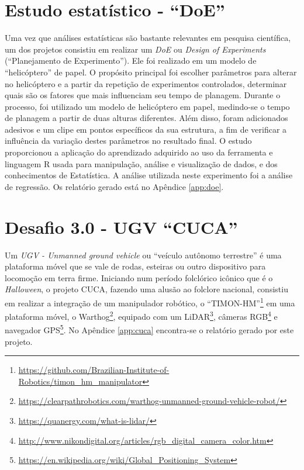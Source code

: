  \section{Estudo estatístico - ``DoE''}

Uma vez que análises estatísticas são bastante relevantes em pesquisa científica, um dos projetos consistiu em realizar um \textit{DoE} ou \textit{Design of Experiments} (``Planejamento de Experimento''). Ele foi realizado em um modelo de ``helicóptero'' de papel. O propósito principal foi escolher parâmetros para alterar no helicóptero e a partir da repetição de experimentos controlados, determinar quais são os fatores que mais influenciam seu tempo de planagem. Durante o processo, foi utilizado um modelo de helicóptero em papel, medindo-se o tempo de planagem a partir de duas alturas diferentes. Além disso, foram adicionados adesivos e um clipe em pontos específicos da sua estrutura, a fim de verificar a influência da variação destes parâmetros no resultado final. O estudo proporcionou a aplicação do aprendizado adquirido ao uso da ferramenta e linguagem R usada para manipulação, análise e visualização de dados, e dos conhecimentos de Estatística. A análise utilizada neste experimento foi a análise de regressão. Os relatório gerado está no Apêndice \ref{app:doe}.

\section{Desafio 3.0 - UGV ``CUCA''}

Um \textit{UGV - Unmanned ground vehicle} ou ``veículo autônomo terrestre'' é uma plataforma móvel que se vale de rodas, esteiras ou outro dispositivo para locomoção em terra firme. Iniciando num período folclórico icônico que é o \textit{Halloween}, o projeto CUCA, fazendo uma alusão ao folclore nacional, consistiu em realizar a integração de um manipulador robótico, o ``TIMON-HM''\footnote{\url{https://github.com/Brazilian-Institute-of-Robotics/timon_hm_manipulator}} em uma plataforma móvel, o Warthog\footnote{\url{https://clearpathrobotics.com/warthog-unmanned-ground-vehicle-robot/}}, equipado com um LiDAR\footnote{\url{https://quanergy.com/what-is-lidar/}}, câmeras RGB\footnote{\url{http://www.nikondigital.org/articles/rgb_digital_camera_color.htm}} e navegador GPS\footnote{\url{https://en.wikipedia.org/wiki/Global_Positioning_System}}. No Apêndice \ref{app:cuca} encontra-se o relatório gerado por este projeto.



